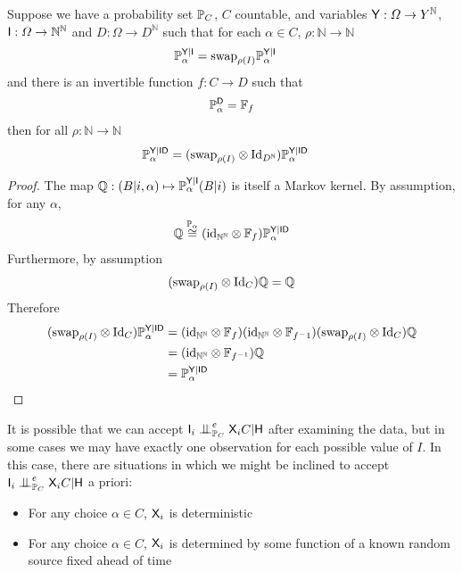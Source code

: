 \begin{theorem}
Suppose we have a probability set $\mathbb{P}_C$, $C$ countable, and variables $\mathsf{Y}:\Omega\to Y^{\mathbb{N}}$, $\mathsf{I}:\Omega\to \mathbb{N}^{\mathbb{N}}$ and $D:\Omega\to D^{\mathbb{N}}$ such that for each $\alpha\in C$, $\rho:\mathbb{N}\to \mathbb{N}$
\begin{align}
    \mathbb{P}_\alpha^{\mathsf{Y}|\mathsf{I}} &= \text{swap}_{\rho(I)}\mathbb{P}_\alpha^{\mathsf{Y}|\mathsf{I}}
\end{align}
and there is an invertible function $f:C\to D$ such that
\begin{align}
    \mathbb{P}_\alpha^{\mathsf{D}} = \mathbb{F}_f
\end{align}
then for all $\rho:\mathbb{N}\to\mathbb{N}$
\begin{align}
    \mathbb{P}_\alpha^{\mathsf{Y}|\mathsf{ID}} &= (\text{swap}_{\rho(I)}\otimes \text{Id}_{D^{\mathbb{N}}} )\mathbb{P}_\alpha^{\mathsf{Y}|\mathsf{ID}}
\end{align}
\end{theorem}

\begin{proof}
The map $\mathbb{Q}:(B|i,\alpha)\mapsto \mathbb{P}_\alpha^{\mathsf{Y}|\mathsf{I}}(B|i)$ is itself a Markov kernel. By assumption, for any $\alpha$,
\begin{align}
    \mathbb{Q} \overset{\mathbb{P}_\alpha}{\cong} (\text{id}_{\mathbb{N}^\mathbb{N}}\otimes\mathbb{F}_f) \mathbb{P}_\alpha^{\mathsf{Y}|\mathsf{ID}}
\end{align}
Furthermore, by assumption
\begin{align}
    (\text{swap}_{\rho(I)}\otimes \text{Id}_{C} )\mathbb{Q} = \mathbb{Q}
\end{align}
Therefore
\begin{align}
    (\text{swap}_{\rho(I)}\otimes \text{Id}_{C} ) \mathbb{P}_\alpha^{\mathsf{Y}|\mathsf{ID}}&= (\text{id}_{\mathbb{N}^\mathbb{N}}\otimes\mathbb{F}_{f})(\text{id}_{\mathbb{N}^\mathbb{N}}\otimes\mathbb{F}_{f^-1})(\text{swap}_{\rho(I)}\otimes \text{Id}_{C} ) \mathbb{Q}\\
     &= (\text{id}_{\mathbb{N}^\mathbb{N}}\otimes\mathbb{F}_{f^{-1}}) \mathbb{Q}\\
     &= \mathbb{P}_\alpha^{\mathsf{Y}|\mathsf{ID}}
\end{align}
\end{proof}

It is possible that we can accept $\RV{I}_i\CI^e_{\prob{P}_C} \RV{X}_i C|\RV{H}$ after examining the data, but in some cases we may have exactly one observation for each possible value of $I$. In this case, there are situations in which we might be inclined to accept $\RV{I}_i\CI^e_{\prob{P}_C} \RV{X}_i C|\RV{H}$ a priori:
\begin{itemize}
    \item For any choice $\alpha\in C$, $\mathsf{X}_i$ is deterministic
    \item For any choice $\alpha\in C$, $\mathsf{X}_i$ is determined by some function of a known random source fixed ahead of time
\end{itemize}

